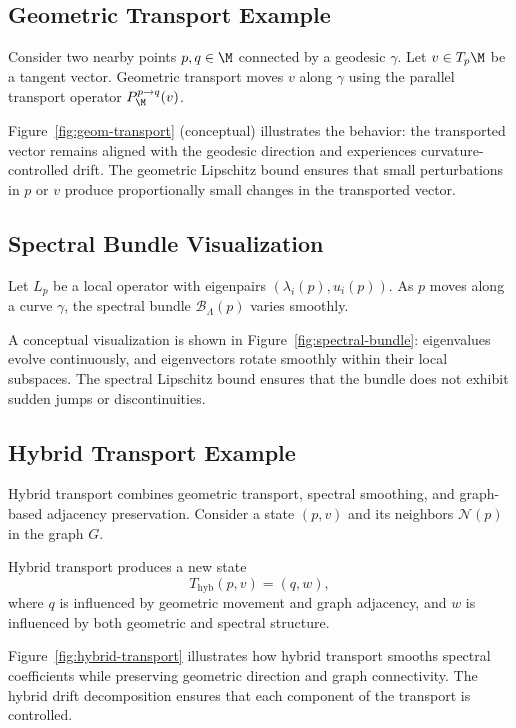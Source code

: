 \documentclass[11pt]{article}
\begin{document}
\subsection{Geometric Transport Example}

Consider two nearby points $p,q \in \M$ connected by a geodesic
$\gamma$. Let $v \in T_p\M$ be a tangent vector. Geometric transport
moves $v$ along $\gamma$ using the parallel transport operator
$P_\M^{p \to q}(v)$.

Figure~\ref{fig:geom-transport} (conceptual) illustrates the behavior:
the transported vector remains aligned with the geodesic direction and
experiences curvature-controlled drift. The geometric Lipschitz bound
ensures that small perturbations in $p$ or $v$ produce proportionally
small changes in the transported vector.

\subsection{Spectral Bundle Visualization}

Let $L_p$ be a local operator with eigenpairs
$(\lambda_i(p), u_i(p))$. As $p$ moves along a curve $\gamma$, the
spectral bundle $\mathcal{B}_\Lambda(p)$ varies smoothly.

A conceptual visualization is shown in Figure~\ref{fig:spectral-bundle}:
eigenvalues evolve continuously, and eigenvectors rotate smoothly within
their local subspaces. The spectral Lipschitz bound ensures that the
bundle does not exhibit sudden jumps or discontinuities.

\subsection{Hybrid Transport Example}

Hybrid transport combines geometric transport, spectral smoothing, and
graph-based adjacency preservation. Consider a state $(p,v)$ and its
neighbors $\mathcal{N}(p)$ in the graph $G$.

Hybrid transport produces a new state
\[
T_{\mathrm{hyb}}(p,v) = (q,w),
\]
where $q$ is influenced by geometric movement and graph adjacency, and
$w$ is influenced by both geometric and spectral structure.

Figure~\ref{fig:hybrid-transport} illustrates how hybrid transport
smooths spectral coefficients while preserving geometric direction and
graph connectivity. The hybrid drift decomposition ensures that each
component of the transport is controlled.
\end{document}
